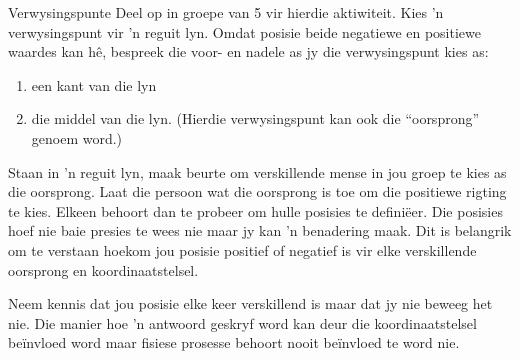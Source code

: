 \begin{groupdiscussion}{Verwysingspunte}
            \nopagebreak
Deel op in groepe van 5 vir hierdie aktiwiteit. Kies  'n verwysingspunt vir  'n reguit lyn. Omdat posisie beide negatiewe en positiewe waardes kan h\^e, bespreek die voor- en nadele as jy die verwysingspunt kies as:
\begin{enumerate}[noitemsep, label=\textbf{\arabic*}. ] 
    \item een kant van die lyn
    \item die middel van die lyn. (Hierdie verwysingspunt kan ook die ``oorsprong'' genoem word.)
\end{enumerate}
Staan in  'n reguit lyn, maak beurte om verskillende mense in jou groep te kies as die oorsprong. Laat die persoon wat die oorsprong is toe om die positiewe rigting te kies. Elkeen behoort dan te probeer om hulle posisies te defini\"eer. Die posisies hoef nie baie presies te wees nie maar jy kan  'n benadering maak. Dit is belangrik om te verstaan hoekom jou posisie positief of negatief is vir elke verskillende oorsprong en koordinaatstelsel.

Neem kennis dat jou posisie elke keer verskillend is maar dat jy nie beweeg het nie. Die manier hoe  'n antwoord geskryf word kan deur die koordinaatstelsel be\"invloed word maar fisiese prosesse behoort nooit be\"invloed te word nie.
\end{groupdiscussion}

